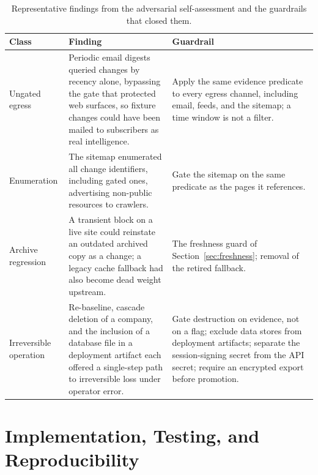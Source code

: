 \documentclass[11pt]{article}
\begin{document}
\begin{table}[htbp]
\centering
\small
\begin{tabularx}{\textwidth}{@{}l X X@{}}
\toprule
\textbf{Class} & \textbf{Finding} & \textbf{Guardrail} \\
\midrule
Ungated egress & Periodic email digests queried changes by recency alone,
bypassing the gate that protected web surfaces, so fixture changes could have
been mailed to subscribers as real intelligence. & Apply the same evidence
predicate to every egress channel, including email, feeds, and the sitemap; a
time window is not a filter. \\
\addlinespace
Enumeration & The sitemap enumerated all change identifiers, including gated
ones, advertising non-public resources to crawlers. & Gate the sitemap on the
same predicate as the pages it references. \\
\addlinespace
Archive regression & A transient block on a live site could reinstate an
outdated archived copy as a change; a legacy cache fallback had also become dead
weight upstream. & The freshness guard of Section~\ref{sec:freshness}; removal of
the retired fallback. \\
\addlinespace
Irreversible operation & Re-baseline, cascade deletion of a company, and the
inclusion of a database file in a deployment artifact each offered a single-step
path to irreversible loss under operator error. & Gate destruction on evidence,
not on a flag; exclude data stores from deployment artifacts; separate the
session-signing secret from the API secret; require an encrypted export before
promotion. \\
\bottomrule
\end{tabularx}
\caption{Representative findings from the adversarial self-assessment and the
guardrails that closed them.}
\label{tab:red}
\end{table}
\FloatBarrier

\section{Implementation, Testing, and Reproducibility}
\label{sec:impl}
\end{document}

